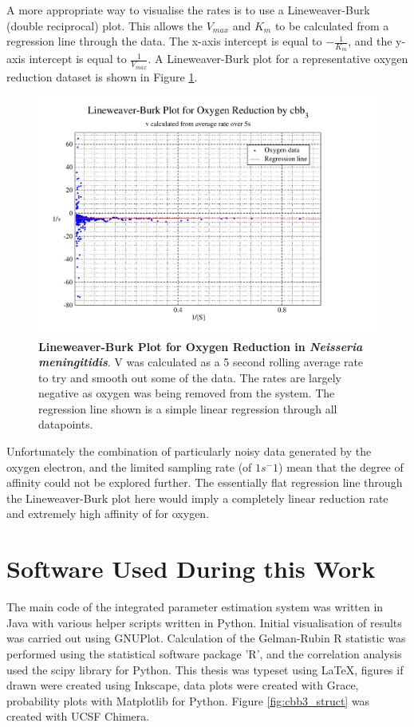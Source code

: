 A more appropriate way to visualise the rates is to use a Lineweaver-Burk (double reciprocal) plot. This allows the $V_{max}$ and $K_m$ to be calculated from a regression line through the data. The x-axis intercept is equal to $-\frac{1}{K_m}$, and the y-axis intercept is equal to $\frac{1}{V_{max}}$. A Lineweaver-Burk plot for a representative oxygen reduction dataset is shown in Figure \ref{fig:o2lb}.
\begin{figure}[ht]
 \centering
 \includegraphics[width=14cm, trim=1cm 1cm 4cm 0.5cm, clip=true]{./appendix/data/lbplot.pdf}
 \caption[{Lineweaver-Burk Plot for Oxygen Reduction in \textit{Neisseria meningitidis}.}]{{\bf Lineweaver-Burk Plot for Oxygen Reduction in \textit{Neisseria meningitidis}}. V was calculated as a 5 second rolling average rate to try and smooth out some of the data. The rates are largely negative as oxygen was being removed from the system. The regression line shown is a simple linear regression through all datapoints.
 \label{fig:o2lb}}
\end{figure}

Unfortunately the combination of particularly noisy data generated by the oxygen electron, and the limited sampling rate (of $1 s^-1$) mean that the degree of affinity could not be explored further. The essentially flat regression line through the Lineweaver-Burk plot here would imply a completely linear reduction rate and extremely high affinity of \cbbthree{} for oxygen.

\section{Software Used During this Work}
The main code of the integrated parameter estimation system was written in Java\texttrademark{} with various helper scripts written in Python. Initial visualisation of results was carried out using GNUPlot. Calculation of the Gelman-Rubin R statistic was performed using the statistical software package 'R', and the correlation analysis used the scipy library for Python. This thesis was typeset using \LaTeX, figures if drawn were created using Inkscape, data plots were created with Grace, probability plots with Matplotlib\cite{Hunter2007a} for Python. Figure \ref{fig:cbb3_struct} was created with UCSF Chimera\cite{Pettersen2004}.